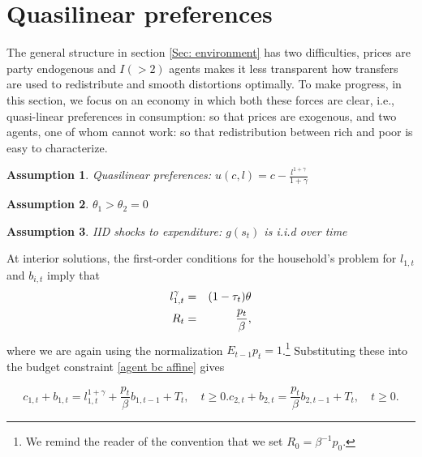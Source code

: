 \documentclass[thmsb,11pt]{article}
\newtheorem{assumption}{Assumption}
\begin{document}
\color{black}

\section{Quasilinear preferences}\label{Sec: quasilinear}

The  general structure in section \ref{Sec: environment}  has two difficulties, prices are party endogenous and $I (> 2)$ agents makes it less transparent how transfers are used to redistribute and smooth distortions optimally. To make progress, in this section, we focus on an economy in which both these forces are clear, i.e., quasi-linear preferences in consumption: so that prices are exogenous, and two agents, one of whom cannot work: so that redistribution between rich and poor is easy to characterize. 


\begin{assumption}
\label{ass quasilinear}
Quasilinear preferences: $u(c,l)=c-\frac{l^{1+\gamma}}{1+\gamma}$
\end{assumption}
\begin{assumption}
 $\theta_1>\theta_2=0$
\end{assumption}
\begin{assumption}
\label{ass iid}
IID shocks to expenditure: $g(s_t)$ is i.i.d over time
\end{assumption}

At interior solutions, the first-order conditions for the household's problem for $l_{1,t}$ and $b_{i,t}$ imply that
\begin{eqnarray*}
l_{1,t}^\gamma & = &(1-\tau_t) \theta \cr
R_t & = & \frac{p_t}{\beta},
\end{eqnarray*}
where we are again using the normalization $E_{t-1} p_t = 1$.\footnote{We  remind the reader of  the convention  that we set  $R_{0}=\beta^{-1} p_0$.} Substituting these into the  budget constraint \eqref{agent bc affine} gives %
 
 \begin{subequations}
 \begin{equation} \label{budget consts substitution agent 1} c_{1,t} + b_{1,t} = l_{1,t}^{1+\gamma} + \frac{p_t}{\beta} b_{1,t-1}+T_t, \quad t \geq 0.
 \end{equation}

 \begin{equation} \label{budget consts substitution agent 2} c_{2,t} + b_{2,t} =  \frac{p_t}{\beta} b_{2,t-1}+T_t, \quad t \geq 0.
 \end{equation}
\end{subequations}
\end{document}
